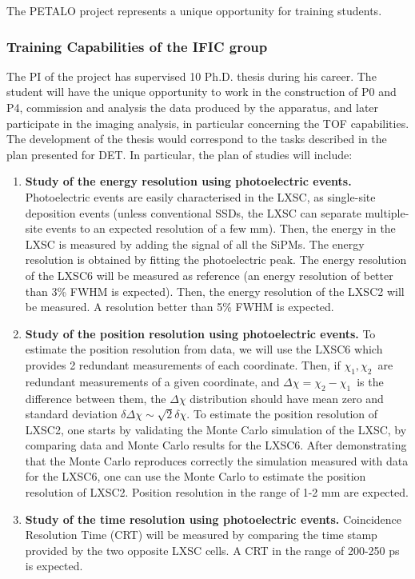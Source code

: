 The PETALO project represents a unique opportunity for training students. 

\subsubsection*{Training Capabilities of the IFIC group}

The PI of the project has supervised  10 Ph.D. thesis during his career. The student will have the unique opportunity to work in the construction of P0 and P4, commission and analysis the data produced by the apparatus, and later participate in the imaging analysis, in particular concerning the TOF capabilities. The development of the thesis would correspond to the tasks described in the plan presented for DET. In particular, the plan of studies will include:

\begin{enumerate}
\item {\bf Study of the energy resolution using photoelectric events.} Photoelectric events are easily characterised in the LXSC, as single-site deposition events (unless conventional SSDs, the LXSC can separate multiple-site events to an expected resolution of a few mm). Then, the energy in the LXSC is measured by adding the signal of all the SiPMs. The energy resolution is obtained by fitting the photoelectric peak. The energy resolution of the LXSC6 will be measured as reference (an energy resolution of better than 3\% FWHM is expected). Then, the energy resolution of the LXSC2 will be measured. A resolution better than 5\% FWHM is expected.
\item {\bf Study of the position resolution using photoelectric events.} To estimate the position resolution from data, we will use the LXSC6 which provides 2 redundant measurements of each coordinate. Then, if $\chi_1,\chi_2$~are redundant measurements of a given coordinate, and $\Delta \chi = \chi_2 - \chi_1$~is the difference between them, the $\Delta \chi$ distribution should have mean zero and standard deviation  
$\delta \Delta \chi \sim \sqrt{2} \delta \chi$. To estimate the position resolution of LXSC2, one starts by validating the Monte Carlo simulation of the LXSC, by comparing data and Monte Carlo results for the LXSC6. After demonstrating that the Monte Carlo reproduces correctly the simulation measured with data for the LXSC6, one can use the Monte Carlo to estimate the position resolution of LXSC2. Position resolution in the range of 1-2 mm are expected. 
\item {\bf Study of the time resolution using photoelectric events.} Coincidence Resolution Time (CRT) will be measured by comparing the time stamp provided by the two opposite LXSC cells. A CRT in the range of 200-250 ps is expected.
\end{enumerate}

